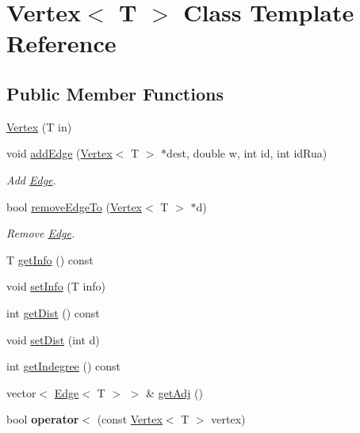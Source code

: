 \hypertarget{class_vertex}{}\section{Vertex$<$ T $>$ Class Template Reference}
\label{class_vertex}
\subsection*{Public Member Functions}
\begin{DoxyCompactItemize}
\item 
\hyperlink{class_vertex_afcbdd4d4198b672356559cb8fa088408}{Vertex} (T in)
\item 
void \hyperlink{class_vertex_a0c7f0692945984cc656e28d2a2044e3c}{add\+Edge} (\hyperlink{class_vertex}{Vertex}$<$ T $>$ $\ast$dest, double w, int id, int id\+Rua)
\begin{DoxyCompactList}\small\item\em Add \hyperlink{class_edge}{Edge}. \end{DoxyCompactList}\item 
bool \hyperlink{class_vertex_ab2b5b43fb1709a901b78718436763a84}{remove\+Edge\+To} (\hyperlink{class_vertex}{Vertex}$<$ T $>$ $\ast$d)
\begin{DoxyCompactList}\small\item\em Remove \hyperlink{class_edge}{Edge}. \end{DoxyCompactList}\item 
T \hyperlink{class_vertex_a48eae2f7af2362634adab02b7b2dbec6}{get\+Info} () const
\item 
void \hyperlink{class_vertex_a31cd60c26640f8072a928ba70eb2f95e}{set\+Info} (T info)
\item 
int \hyperlink{class_vertex_a645a81161bc9f70ebfda8e292b91c24b}{get\+Dist} () const
\item 
void \hyperlink{class_vertex_aeb33d223aa111db88df4151f282b0a86}{set\+Dist} (int d)
\item 
int \hyperlink{class_vertex_ac78980191ea1f9d22e6617e9e511b755}{get\+Indegree} () const
\item 
vector$<$ \hyperlink{class_edge}{Edge}$<$ T $>$ $>$ \& \hyperlink{class_vertex_a23491e86779a2d2de8fa012710fef170}{get\+Adj} ()
\item 
\mbox{\label{class_vertex_a7091b26f281a5041b1775a3d3f9cb7a6}} 
bool {\bfseries operator$<$} (const \hyperlink{class_vertex}{Vertex}$<$ T $>$ vertex)
\end{DoxyCompactItemize}
